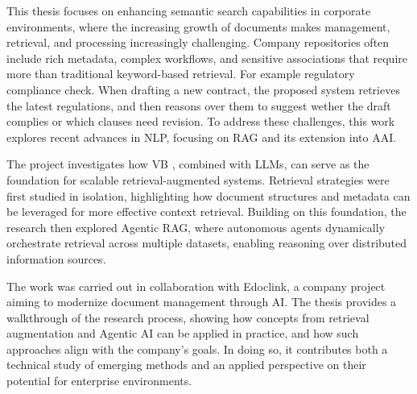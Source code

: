 \acresetall
\noindent  
This thesis focuses on enhancing semantic search capabilities in corporate environments, where the increasing growth of documents makes management, retrieval, and processing increasingly challenging. Company repositories often include rich metadata, complex workflows, and sensitive associations that require more than traditional keyword-based retrieval. For example regulatory compliance check. When drafting a new contract, the proposed system retrieves the latest regulations, and then reasons over them to suggest wether the draft complies or which clauses need revision.
To address these challenges, this work explores recent advances in \ac{NLP}, focusing on \ac{RAG} and its extension into \ac{AAI}.

The project investigates how \ac{VB} , combined with \acp{LLM}, can serve as the foundation for scalable retrieval-augmented systems. Retrieval strategies were first studied in isolation, highlighting how document structures and metadata can be leveraged for more effective context retrieval. Building on this foundation, the research then explored Agentic RAG, where autonomous agents dynamically orchestrate retrieval across multiple datasets, enabling reasoning over distributed information sources.

The work was carried out in collaboration with Edoclink, a company project aiming to modernize document management through AI. The thesis provides a walkthrough of the research process, showing how concepts from retrieval augmentation and Agentic AI can be applied in practice, and how such approaches align with the company’s goals. In doing so, it contributes both a technical study of emerging methods and an applied perspective on their potential for enterprise environments.